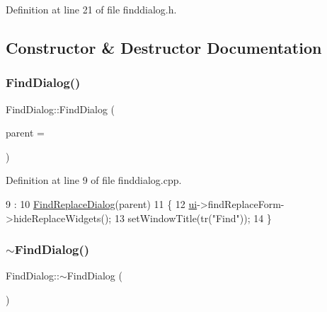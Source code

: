 Definition at line 21 of file finddialog.\+h.



\subsection{Constructor \& Destructor Documentation}
\mbox{\label{class_ui_1_1_find_dialog_af9dc0e86bec39e9b3a0b954a603a8e76}} 
\subsubsection{\texorpdfstring{Find\+Dialog()}{FindDialog()}}
{\footnotesize\ttfamily Find\+Dialog\+::\+Find\+Dialog (\begin{DoxyParamCaption}\item[{Q\+Widget $\ast$}]{parent = {} }\end{DoxyParamCaption})}



Definition at line 9 of file finddialog.\+cpp.


\begin{DoxyCode}
9                                       :
10     \hyperlink{class_ui_1_1_find_replace_dialog_a2631641ec6995a87bc4da0a99fb6f9bd}{FindReplaceDialog}(parent)
11 \{
12     \hyperlink{class_ui_1_1_find_replace_dialog_a29b7e2e415bc683d3dd089b366cccf4a}{ui}->findReplaceForm->hideReplaceWidgets();
13     setWindowTitle(tr(\textcolor{stringliteral}{"Find"}));
14 \}
\end{DoxyCode}
\mbox{\label{class_ui_1_1_find_dialog_ad558e82173272809593fb557f6ec88b0}} 
\subsubsection{\texorpdfstring{$\sim$\+Find\+Dialog()}{~FindDialog()}}
{\footnotesize\ttfamily Find\+Dialog\+::$\sim$\+Find\+Dialog (\begin{DoxyParamCaption}{ }\end{DoxyParamCaption})}



